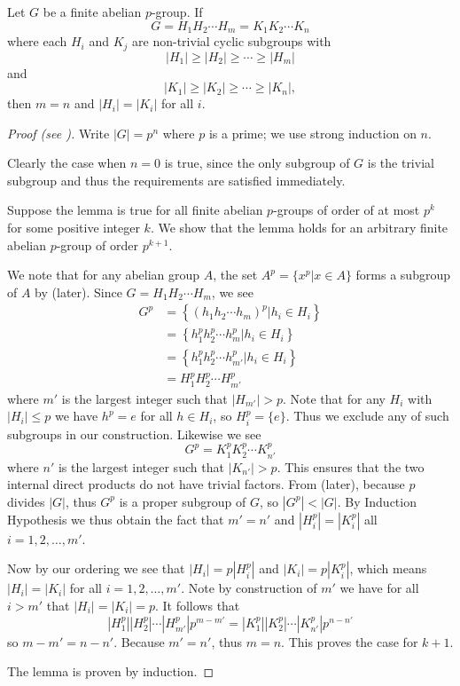 \begin{lemma}\label{lemma-fundamental-theorem-of-finite-abelian-groups-4}
    Let $G$ be a finite abelian $p$-group. If
    \[
        G = H_1H_2\cdots H_m = K_1K_2\cdots K_n
    \]
    where each $H_i$ and $K_j$ are non-trivial cyclic subgroups with
    \[
        |H_1| \geq |H_2| \geq \cdots \geq |H_m|
    \]
    and
    \[
        |K_1| \geq |K_2| \geq \cdots \geq |K_n|,
    \]
    then $m = n$ and $|H_i| = |K_i|$ for all $i$.
\end{lemma}
\begin{proof}[Proof (see {\cite[p.~219, Lemma 4]{gallian_2016}})]
    Write $|G| = p^n$ where $p$ is a prime; we use strong induction on $n$.

    Clearly the case when $n = 0$ is true, since the only subgroup of $G$ is the trivial subgroup and thus the requirements are satisfied immediately.

    Suppose the lemma is true for all finite abelian $p$-groups of order of at most $p^k$ for some positive integer $k$. We show that the lemma holds for an arbitrary finite abelian $p$-group of order $p^{k+1}$.

    We note that for any abelian group $A$, the set $A^p = \{x^p \vert x \in A\}$ forms a subgroup of $A$ by  (later). Since $G = H_1H_2\cdots H_m$, we see
    \begin{align*}
        G^p &= \left\{\left(h_1h_2\cdots h_m\right)^p \vert h_i \in H_i\right\}\\
        &= \left\{h_1^ph_2^p\cdots h_m^p \vert h_i \in H_i\right\}\\
        &= \left\{h_1^ph_2^p\cdots h_{m'}^p \vert h_i \in H_i\right\}\\
        &= H_1^pH_2^p\cdots H_{m'}^p
    \end{align*}
    where $m'$ is the largest integer such that $|H_{m'}| > p$. Note that for any $H_i$ with $|H_i| \leq p$ we have $h^p = e$ for all $h \in H_i$, so $H_i^p = \{e\}$. Thus we exclude any of such subgroups in our construction. Likewise we see
    \[
        G^p = K_1^pK_2^p\cdots K_{n'}^p
    \]
    where $n'$ is the largest integer such that $|K_{n'}| > p$. This ensures that the two internal direct products do not have trivial factors. From  (later), because $p$ divides $|G|$, thus $G^p$ is a proper subgroup of $G$, so $|G^p| < |G|$. By Induction Hypothesis we thus obtain the fact that $m' = n'$ and $|H_i^p| = |K_i^p|$ all $i = 1, 2, \dots, m'$.

    Now by our ordering we see that $|H_i| = p|H_i^p|$ and $|K_i| = p|K_i^p|$, which means $|H_i| = |K_i|$ for all $i = 1, 2, \dots, m'$. Note by construction of $m'$ we have for all $i > m'$ that $|H_i| = |K_i| = p$. It follows that
    \[
        |H_1^p||H_2^p|\cdots|H_{m'}^p|p^{m-m'} = |K_1^p||K_2^p|\cdots|K_{n'}^p|p^{n-n'}  
    \]
    so $m - m' = n - n'$. Because $m' = n'$, thus $m = n$. This proves the case for $k + 1$.

    The lemma is proven by induction.
\end{proof}

